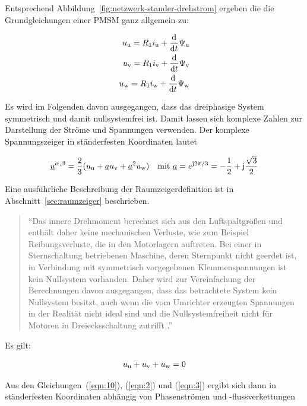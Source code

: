 Entsprechend Abbildung~\ref{fig:netzwerk-stander-drehstrom} ergeben die die Grundgleichungen einer PMSM ganz allgemein zu:

\begin{align}
u_{\mathrm{u}} = R_{\mathrm{1}}i_{\mathrm{u}} + \frac{\mathrm{d}}{\mathrm{d}t}\Psi_{\mathrm{u}} \nonumber \\ 
u_{\mathrm{v}} = R_{\mathrm{1}}i_{\mathrm{v}} + \frac{\mathrm{d}}{\mathrm{d}t}\Psi_{\mathrm{v}} \label{eqn:10} \\ 
u_{\mathrm{w}} = R_{\mathrm{1}}i_{\mathrm{w}} + \frac{\mathrm{d}}{\mathrm{d}t}\Psi_{\mathrm{w}} \nonumber
\end{align}

Es wird im Folgenden davon ausgegangen, dass das dreiphasige System symmetrisch und damit nullsystemfrei ist.
Damit lassen sich komplexe Zahlen zur Darstellung der Ströme und Spannungen verwenden.
Der komplexe Spannungszeiger in ständerfesten Koordinaten lautet

\begin{align}
\underline{u}^{\alpha, \beta} = \frac{2}{3}(u_{\mathrm{u}} + \underline{a} u_{\mathrm{v}} + \underline{a}^2 u_{\mathrm{w}} ) \quad \text{mit}\,\, \underline{a} = e^{\mathrm{j}2\pi/3} = -\frac{1}{2}+\mathrm{j}\frac{\sqrt{3}}{2} \label{eqn:2}
\end{align}

Eine ausführliche Beschreibung der Raumzeigerdefinition ist in Abschnitt~\ref{sec:raumzeiger} beschrieben.

\begin{quote}
\enquote{Das innere Drehmoment berechnet sich aus den Luftspaltgrößen und enthält daher keine mechanischen Verluste, wie zum Beispiel Reibungsverluste, die in den Motorlagern auftreten.
Bei einer in Sternschaltung betriebenen Maschine, deren Sternpunkt nicht geerdet ist, in Verbindung mit symmetrisch vorgegebenen Klemmenspannungen ist kein Nullsystem vorhanden.
Daher wird zur Vereinfachung der Berechnungen davon ausgegangen, dass das betrachtete System kein Nullsystem besitzt, auch wenn die vom Umrichter erzeugten Spannungen in der Realität nicht ideal sind und die Nullsystemfreiheit nicht für Motoren in Dreiecksschaltung zutrifft \autocite[S.~25]{kellner2012}.}
\end{quote}

Es gilt:

\begin{align}
u_{\mathrm{u}} + u_{\mathrm{v}} + u_{\mathrm{w}} = 0 \label{eqn:3}
\end{align}

Aus den Gleichungen~(\ref{eqn:10}), (\ref{eqn:2}) und (\ref{eqn:3}) ergibt sich dann in ständerfesten Koordinaten abhängig von Phasenströmen und -flussverkettungen

